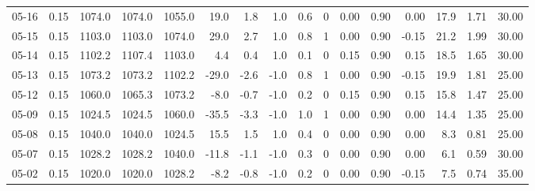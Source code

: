 \begin{threeparttable}
{\begin{tabular}{lrrrrrrrrrrrrrrr}
  05-16 &     0.15 & 1074.0 & 1074.0 & 1055.0 &       19.0 &            1.8 &                      1.0 &                 0.6 &              0 &       0.00 &      0.90 &           0.00 &             17.9 &            1.71 &                  30.00 \\
  05-15 &     0.15 & 1103.0 & 1103.0 & 1074.0 &       29.0 &            2.7 &                      1.0 &                 0.8 &              1 &       0.00 &      0.90 &          -0.15 &             21.2 &            1.99 &                  30.00 \\
  05-14 &     0.15 & 1102.2 & 1107.4 & 1103.0 &        4.4 &            0.4 &                      1.0 &                 0.1 &              0 &       0.15 &      0.90 &           0.15 &             18.5 &            1.65 &                  30.00 \\
  05-13 &     0.15 & 1073.2 & 1073.2 & 1102.2 &      -29.0 &           -2.6 &                     -1.0 &                 0.8 &              1 &       0.00 &      0.90 &          -0.15 &             19.9 &            1.81 &                  25.00 \\
  05-12 &     0.15 & 1060.0 & 1065.3 & 1073.2 &       -8.0 &           -0.7 &                     -1.0 &                 0.2 &              0 &       0.15 &      0.90 &           0.15 &             15.8 &            1.47 &                  25.00 \\
  05-09 &     0.15 & 1024.5 & 1024.5 & 1060.0 &      -35.5 &           -3.3 &                     -1.0 &                 1.0 &              1 &       0.00 &      0.90 &           0.00 &             14.4 &            1.35 &                  25.00 \\
  05-08 &     0.15 & 1040.0 & 1040.0 & 1024.5 &       15.5 &            1.5 &                      1.0 &                 0.4 &              0 &       0.00 &      0.90 &           0.00 &              8.3 &            0.81 &                  25.00 \\
  05-07 &     0.15 & 1028.2 & 1028.2 & 1040.0 &      -11.8 &           -1.1 &                     -1.0 &                 0.3 &              0 &       0.00 &      0.90 &           0.00 &              6.1 &            0.59 &                  30.00 \\
  05-02 &     0.15 & 1020.0 & 1020.0 & 1028.2 &       -8.2 &           -0.8 &                     -1.0 &                 0.2 &              0 &       0.00 &      0.90 &          -0.15 &              7.5 &            0.74 &                  35.00 \\

\end{tabular}}
\end{threeparttable}
